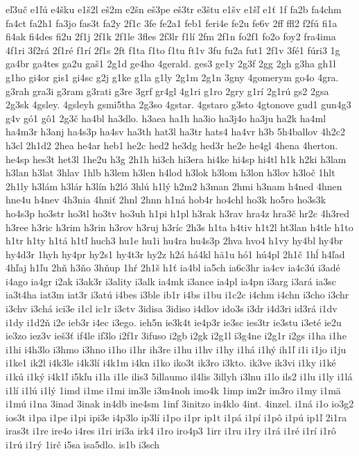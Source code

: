 {eľ3uč
e1ľú
e4šku
e1š2l
eš2m
e2šn
eš3pe
eš3tr
e3štu
e1šv
e1šľ
e1ť
1f
fa2b
fa4chm
fa4ct
fa2h1
fa3jo
fas3t
fa2y
2f1c
3fe
fe2a1
feb1
feri4e
fe2u
fe6v
2ff
ffl2
f2fú
fi1a
fi4ak
fi4des
fi2u
2f1j
2f1k
2f1le
3fles
2f3lr
f1lí
2fm
2f1n
fo2f1
fo2o
foy2
fra4ima
4f1ri
3f2rá
2f1ré
f1rí
2f1s
2ft
f1ta
f1to
f1tu
ft1v
3fu
fu2a
fut1
2f1v
3fé1
fúri3
1g
ga4br
ga4tes
ga2u
gaš1
2g1d
ge4ho
4gerald.
ges3
ge1y
2g3f
2gg
2gh
g3ha
gh1l
g1ho
gi4or
gis1
gi4sc
g2j
g1ke
g1la
g1ly
2g1m
2g1n
3gny
4gomerym
go4o
4gra.
g3rah
gra3i
g3ram
g3rati
g3re
3grf
gr4gl
4g1ri
g1ro
2gry
g1rí
2g1rú
gs2
2gsa
2g3sk
4gsley.
4gsleyh
gsmi5tha
2g3so
4gstar.
4gstaro
g3sto
4gtonove
gud1
gun4g3
g4v
gó1
gô1
2g3č
ha4bl
ha3dlo.
h3aea
ha1h
ha3io
ha3j4o
ha3ju
ha2k
ha4ml
ha4m3r
h3anj
ha4s3p
ha4sv
ha3th
hat3l
ha3tr
hats4
ha4vr
h3b
5h4ballov
4h2c2
h3cl
2h1d2
2hea
he4ar
heb1
he2c
hed2
he3dg
hed3r
he2e
he4gl
4hena
4herton.
he4sp
hes3t
het3l
1he2u
h3g
2h1h
hi3ch
hi3era
hi4ke
hi4sp
hi4tl
h1k
h2ki
h3lam
h3lan
h3lat
3hlav
1hlb
h3lem
h3len
h4lod
h3lok
h3lom
h3lon
h3lov
h3loč
1hlt
2h1ly
h3lám
h3lár
h3lín
h2ló
3hlú
h1lý
h2m2
h3man
2hmi
h3nam
h4ned
4hnen
hne4u
h4nev
4h3nia
4hniť
2hnl
2hnn
h1ná
hob4r
ho4chl
ho3k
ho5ro
ho3s3k
ho4s3p
ho3str
ho3tl
ho3tv
ho3uh
h1pi
h1pl
h3rak
h3rav
hra4z
hra3č
hr2c
4h3red
h3ree
h3ric
h3rim
h3rin
h3rov
h3ruj
h3ríc
2h3s
h1ta
h4tiv
h1t2l
ht3lan
h4tle
h1to
h1tr
h1ty
h1tá
h1tľ
huch3
hu1e
hu1i
hu4ra
hu4s3p
2hva
hvo4
h1vy
hy4bl
hy4br
hy4d3r
1hyh
hy4pr
hy2s1
hy4t3r
hy2z
h2á
há4kl
hä1u
hó1
hú4pl
2h1č
1hĺ
h4ľad
4hľaj
h1ľu
2hň
h3ňo
3hňup
1hŕ
2h1š
h1ť
ia4bl
ia5ch
ia6c3hr
ia4cv
ia4c3ú
i3adé
i4ago
ia4gr
i2ak
i3ak3r
i3ality
i3alk
ia4mk
i3ance
ia4pl
ia4pn
i3arg
i3ará
ia3sc
ia3t4ha
iat3m
iat3r
i3atú
i4bes
i3ble
ib1r
i4bs
i1bu
i1c2c
i4chm
i4chn
i3cho
i3chr
i3chv
i3chá
ici3e
i1cl
ic1r
i3ctv
3idisa
3idiso
i4dlov
ido3s
i3dr
i4d3ri
id3rá
i1dv
i1dy
i1d2ň
i2e
ieb3r
i4ec
i3ego.
ieh5n
ie3k4t
ie4p3r
ie3sc
ies3tr
ie3stu
i3eté
ie2u
ie3zo
iez3v
ieš3ť
if4le
if3lo
i2f1r
3ifuso
i2gb
i2gk
i2g1l
i3g4ne
i2g1r
i2gs
i1ha
i1he
i1hi
i4h3lo
i3hmo
i3hno
i1ho
i1hr
ih3re
i1hu
i1hv
i1hy
i1há
i1hý
ih1ľ
i1i
i1jo
i1ju
i1ke1
ik2l
i4k3le
i4k3lí
i4k1m
i4kn
i1ko
iko3t
ik3ro
i3kto.
ik3ve
ik3vi
i1ky
i1ké
i1kú
i1ký
i4k1ľ
i5kľu
i1la
i1le
ilis3
5illaumo
il4lis
3illyh
i3lnu
i1lo
ils2
i1lu
i1ly
i1lá
i1lí
i1lú
i1lý
1imd
i1me
i1mi
im3le
i3m4noh
imo4k
1imp
im2r
im3ro
i1my
i1mä
i1mú
i1na
3inad
3inak
in4db
ine4sm
1inf
3initzo
in4klo
4int.
4inzel.
i1ná
i1o
io3g2
ios3t
i1pa
i1pe
i1pi
ipi3e
i4p3lo
ip3lí
i1po
i1pr
ip1t
i1pá
i1pí
i1pô
i1pú
ip1ľ
2i1ra
iras3t
i1re
ire4o
i4res
i1ri
iri3a
irk4
i1ro
iro4p3
1irr
i1ru
i1ry
i1rá
i1ré
i1rí
i1rô
i1rú
i1rý
1irč
i5sa
isa5dlo.
is1b
i3sch
}
